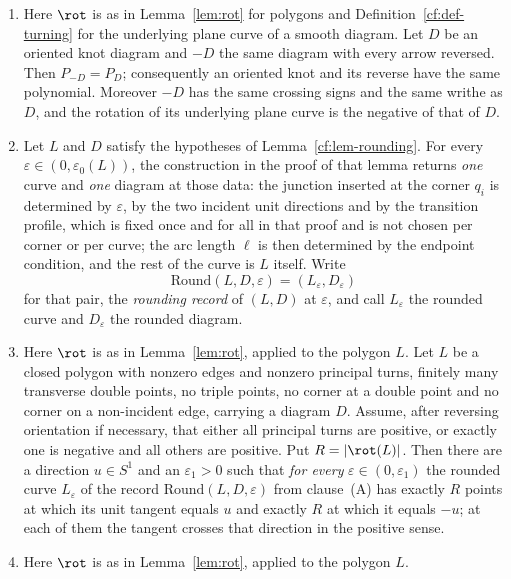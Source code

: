 \begin{theorem}\label{cf:thm-carrierfloor}\leanok
\begin{enumerate}
\item[(R)] Here $\rot$ is as in Lemma~\ref{lem:rot} for polygons and
Definition~\ref{cf:def-turning} for the underlying plane curve of a
smooth diagram. Let $D$ be an oriented knot diagram and $-D$ the same
diagram with every arrow reversed. Then $P_{-D}=P_D$; consequently an
oriented knot and its reverse have the same polynomial. Moreover $-D$ has
the same crossing signs and the same writhe as $D$, and the rotation of
its underlying plane curve is the negative of that of $D$.
\item[(A)] Let $L$ and $D$ satisfy the hypotheses of Lemma~\ref{cf:lem-rounding}. For every
$\varepsilon\in(0,\varepsilon_0(L))$, the construction in the proof of that
lemma returns \emph{one} curve and \emph{one} diagram at those data: the
junction inserted at the corner $q_i$ is determined by $\varepsilon$, by the
two incident unit directions and by the transition profile, which is fixed once
and for all in that proof and is not chosen per corner or per curve; the arc
length $\ell$ is then determined by the endpoint condition, and the rest of the
curve is $L$ itself. Write
\[
   \mathrm{Round}(L,D,\varepsilon)=(L_\varepsilon,D_\varepsilon)
\]
for that pair, the \emph{rounding record} of $(L,D)$ at $\varepsilon$, and call
$L_\varepsilon$ the rounded curve and $D_\varepsilon$ the rounded diagram.
\item[(B)] Here $\rot$ is as in Lemma~\ref{lem:rot}, applied to the polygon $L$.
Let $L$ be a closed polygon with nonzero edges and nonzero principal
turns, finitely many transverse double points, no triple points, no corner
at a double point and no corner on a non-incident edge, carrying a diagram
$D$. Assume, after reversing orientation if necessary, that either all
principal turns are positive, or exactly one is negative and all others
are positive. Put $R=|\rot(L)|$. Then
there are a direction $u\in S^1$ and an $\varepsilon_1>0$ such that \emph{for
every} $\varepsilon\in(0,\varepsilon_1)$ the rounded curve $L_\varepsilon$ of
the record $\mathrm{Round}(L,D,\varepsilon)$
from clause~(A) has exactly $R$ points at which its unit
tangent equals $u$ and exactly $R$ at which it equals $-u$; at each of them the
tangent crosses that direction in the positive sense.
\item[(C)] Here $\rot$ is as in Lemma~\ref{lem:rot}, applied to the polygon $L$.

\end{enumerate}
\end{theorem}
